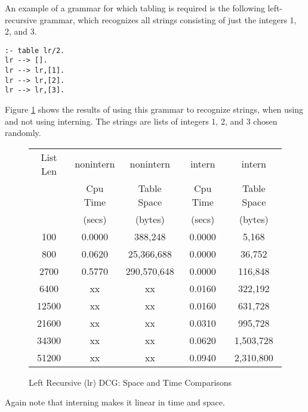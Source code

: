 \documentclass{llncs}
\begin{document}
An example of a grammar for which tabling is required is the following
left-recursive grammar, which recognizes all strings consisting of just
the integers 1, 2, and 3.
\begin{verbatim}
:- table lr/2.
lr --> [].
lr --> lr,[1].
lr --> lr,[2].
lr --> lr,[3].
\end{verbatim}
Figure \ref{lrrec-table} shows the results of using this grammar to
recognize strings, when using and not using interning.  The strings
are lists of integers 1, 2, and 3 chosen randomly.
\begin{figure}
\begin{center}
\begin{tabular}{|c|c|c|c|c|} \hline
List Len &  nonintern &      nonintern  &     intern &      intern \\
         &   Cpu Time &     Table Space &    Cpu Time &    Table Space \\
	 &    (secs)  &        (bytes)  &      (secs) &      (bytes)\\ \hline
100      &  0.0000    &        388,248   &     0.0000  &     5,168  \\
800      &  0.0620    &      25,366,688  &     0.0000  &    36,752   \\
2700      &  0.5770    &    290,570,648  &     0.0000  &    116,848   \\
6400      &  xx    &     xx   &     0.0160  &  322,192     \\
12500      &  xx    &    xx   &     0.0160  &  631,728    \\
21600      &  xx    &    xx   &     0.0310  &  995,728   \\
34300      &  xx    &    xx   &     0.0620  &  1,503,728  \\
51200      &  xx    &    xx   &     0.0940  &  2,310,800  \\ \hline
\end{tabular}
\caption{Left Recursive (lr) DCG: Space and Time Comparisons}\label{lrrec-table}
\end{center}
\end{figure}
Again note that interning makes it linear in time and space.
\end{document}
